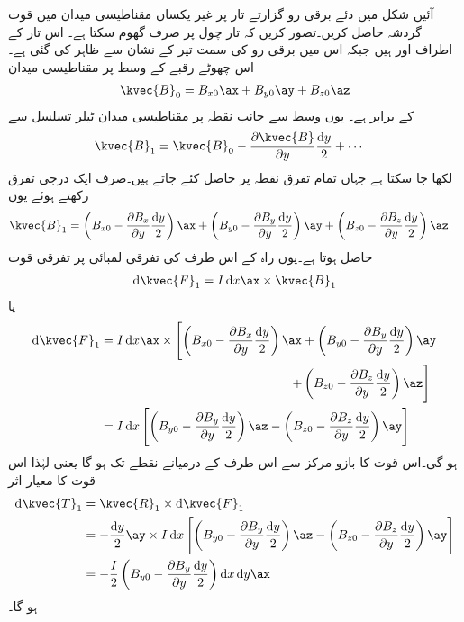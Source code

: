 آئیں شکل  میں دئے  برقی رو گزارتے تار پر غیر یکساں مقناطیسی میدان  میں قوت گردشہ حاصل کریں۔تصور کریں کہ تار چول  پر صرف گھوم سکتا ہے۔ اس تار کے اطراف  اور  ہیں جبکہ اس میں برقی رو  کی سمت تیر کے نشان سے ظاہر کی گئی ہے۔اس چھوٹے رقبے کے وسط  پر مقناطیسی میدان
\begin{align}
\kvec{B}_0=B_{x0}\ax+B_{y0}\ay+B_{z0}\az
\end{align}
کے برابر ہے۔ یوں وسط سے  جانب نقطہ  پر مقناطیسی میدان ٹیلر تسلسل سے
\begin{align*}
\kvec{B}_1&=\kvec{B}_0 -\frac{\partial \kvec{B}}{\partial y}\frac{\dif y}{2}+\cdots
\end{align*}
لکھا جا سکتا ہے جہاں تمام تفرق نقطہ  پر حاصل کئے جاتے ہیں۔صرف ایک درجی تفرق رکھتے ہوئے یوں
\begin{align*}
\kvec{B}_1&=\left(B_{x0}-\frac{\partial B_{x}}{\partial y} \frac{\dif y}{2}\right)\ax+\left(B_{y0}-\frac{\partial B_{y}}{\partial y} \frac{\dif y}{2}\right)\ay+\left(B_{z0}-\frac{\partial B_{z}}{\partial y} \frac{\dif y}{2}\right)\az
\end{align*}
حاصل ہوتا ہے۔یوں راہ کے اس طرف کی  تفرقی لمبائی پر تفرقی قوت
\begin{align*}
\dif \kvec{F}_1=I \dif x \ax \times \kvec{B}_1
\end{align*}
یا
\begin{align*}
\dif \kvec{F}_1&=I \dif x \ax \times \left[\left(B_{x0}-\frac{\partial B_{x}}{\partial y} \frac{\dif y}{2}\right)\ax+\left(B_{y0}-\frac{\partial B_{y}}{\partial y} \frac{\dif y}{2}\right)\ay \right. \\
& \quad \quad\quad \quad\quad \quad\quad \quad\quad \quad\quad \quad\quad\quad \quad \left. +\left(B_{z0}-\frac{\partial B_{z}}{\partial y} \frac{\dif y}{2}\right)\az \right]\\
&=I \dif x \left[\left(B_{y0}-\frac{\partial B_{y}}{\partial y} \frac{\dif y}{2}\right)\az-\left(B_{z0}-\frac{\partial B_{z}}{\partial y} \frac{\dif y}{2}\right)\ay \right]
\end{align*}
ہو گی۔اس قوت کا بازو مرکز سے اس طرف کے درمیانے نقطے تک ہو گا یعنی  لہٰذا اس قوت کا معیار اثر
\begin{align*}
\dif \kvec{T}_1&=\kvec{R}_1 \times \dif \kvec{F}_1\\
&=-\frac{\dif y}{2}\ay \times I \dif x \left[\left(B_{y0}-\frac{\partial B_{y}}{\partial y} \frac{\dif y}{2}\right)\az-\left(B_{z0}-\frac{\partial B_{z}}{\partial y} \frac{\dif y}{2}\right)\ay \right]\\
&=- \frac{I}{2}\left(B_{y0}-\frac{\partial B_{y}}{\partial y} \frac{\dif y}{2}\right)\dif x \dif y \ax
\end{align*}
ہو گا۔

